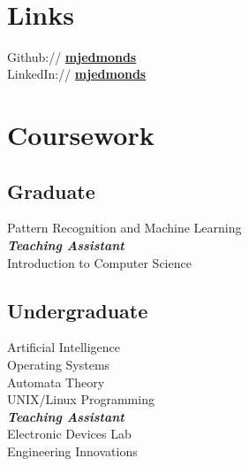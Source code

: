 \documentclass[letterpaper]{deedy-resume} %
\begin{document}
\begin{minipage}[t]{0.32\textwidth}
 \\

\sectionspace %


\section{Links} 

Github:// \href{https://github.com/mjedmonds}{\bf mjedmonds} \\
LinkedIn:// \href{https://www.linkedin.com/in/mjedmonds}{\bf mjedmonds} \\

\sectionspace %


\section{Coursework}

\subsection{Graduate}

Pattern Recognition and Machine Learning\\
{\footnotesize \textit{\textbf{Teaching Assistant}}} \\
Introduction to Computer Science

\sectionspace %


\subsection{Undergraduate}

Artificial Intelligence \\
Operating Systems \\
Automata Theory\\
UNIX/Linux Programming \\
{\footnotesize \textit{\textbf{Teaching Assistant}}} \\
Electronic Devices Lab\\
Engineering Innovations


\end{minipage}
\end{document}
